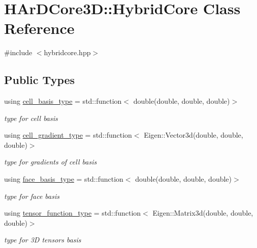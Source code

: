 \hypertarget{classHArDCore3D_1_1HybridCore}{}\section{H\+Ar\+D\+Core3D\+:\+:Hybrid\+Core Class Reference}
\label{classHArDCore3D_1_1HybridCore}


{\ttfamily \#include $<$hybridcore.\+hpp$>$}

\subsection*{Public Types}
\begin{DoxyCompactItemize}
\item 
\mbox{\label{classHArDCore3D_1_1HybridCore_a9e760b418a3948b34114879f37086829}} 
using \hyperlink{classHArDCore3D_1_1HybridCore_a9e760b418a3948b34114879f37086829}{cell\+\_\+basis\+\_\+type} = std\+::function$<$ double(double, double, double)$>$
\begin{DoxyCompactList}\small\item\em type for cell basis \end{DoxyCompactList}\item 
\mbox{\label{classHArDCore3D_1_1HybridCore_ad4dd9ca67d6de59d7ea71c816d3d3e67}} 
using \hyperlink{classHArDCore3D_1_1HybridCore_ad4dd9ca67d6de59d7ea71c816d3d3e67}{cell\+\_\+gradient\+\_\+type} = std\+::function$<$ Eigen\+::\+Vector3d(double, double, double)$>$
\begin{DoxyCompactList}\small\item\em type for gradients of cell basis \end{DoxyCompactList}\item 
\mbox{\label{classHArDCore3D_1_1HybridCore_ae0b0cdad94d3527d0b06e601c091cdad}} 
using \hyperlink{classHArDCore3D_1_1HybridCore_ae0b0cdad94d3527d0b06e601c091cdad}{face\+\_\+basis\+\_\+type} = std\+::function$<$ double(double, double, double)$>$
\begin{DoxyCompactList}\small\item\em type for face basis \end{DoxyCompactList}\item 
\mbox{\label{classHArDCore3D_1_1HybridCore_ae3e174245a6104913a2272e7fe96db46}} 
using \hyperlink{classHArDCore3D_1_1HybridCore_ae3e174245a6104913a2272e7fe96db46}{tensor\+\_\+function\+\_\+type} = std\+::function$<$ Eigen\+::\+Matrix3d(double, double, double)$>$
\begin{DoxyCompactList}\small\item\em type for 3D tensors basis \end{DoxyCompactList}\end{DoxyCompactItemize}
